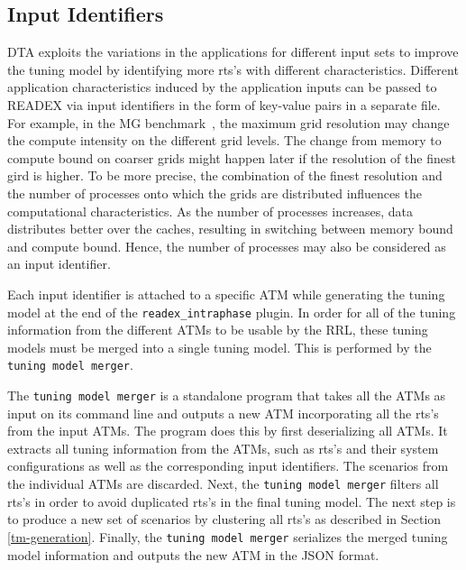 \subsection{Input Identifiers} \label{sec:input}

DTA exploits the variations in the applications for different input sets to improve the tuning model by identifying more rts's with different characteristics. Different application characteristics induced by the application inputs can be passed to READEX via input identifiers in the form of key-value pairs in a separate file. For example, in the MG benchmark~\cite{npb}, the maximum grid resolution may change the compute intensity on the different grid levels. The change from memory to compute bound on coarser grids might happen later if the resolution of the finest gird is higher. To be more precise, the combination of the finest resolution and the number of processes onto which the grids are distributed influences the computational characteristics. As the number of processes increases, data distributes better over the caches, resulting in switching between memory bound and compute bound. Hence, the number of processes may also be considered as an input identifier. 

Each input identifier is attached to a specific ATM while generating the tuning model at the end of the \texttt{readex\_intraphase} plugin. In order for all of the tuning information from the different ATMs to be usable by the RRL, these tuning models must be merged into a single tuning model. This is performed by the \texttt{tuning model merger}.

The \texttt{tuning model merger} is a standalone program that takes all the ATMs as input on its command line and outputs a new ATM incorporating all the rts's from the input ATMs. The program does this by first deserializing all ATMs. It extracts all tuning information from the ATMs, such as rts's and their system configurations as well as the corresponding input identifiers. The scenarios from the individual ATMs are discarded. Next, the \texttt{tuning model merger} filters all rts's in order to avoid duplicated rts's in the final tuning model. The next step is to produce a new set of scenarios by clustering all rts's as described in Section \ref{tm-generation}. Finally, the \texttt{tuning model merger} serializes the merged tuning model information and outputs the new ATM in the JSON format.
